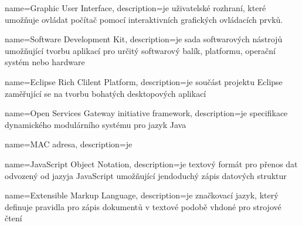 {
	name=Graphic User Interface,
	description={je uživatelské rozhraní, které umožňuje ovládat počítač pomocí
	interaktivních grafických ovládacích prvků.}
}

{
	name=Software Development Kit,
	description={je sada softwarových nástrojů umožňující tvorbu aplikací pro
	určitý softwarový balík, platformu, operační systém nebo hardware}
}

{
	name=Eclipse Rich Clilent Platform,
	description={je součást projektu Eclipse zaměřující se na tvorbu bohatých
	desktopových aplikací} 
}

{
	name=Open Services Gateway initiative framework,
	description={je specifikace dynamického modulárního systému pro jazyk Java} 
}

{
	name=MAC adresa,
	description={je } 
}

{
	name=JavaScript Object Notation,
	description={je textový formát pro přenos dat odvozený od jazyja JavaScript
	umožňující jendoduchý zápis datových struktur} 
}

{
	name=Extensible Markup Language,
	description={je značkovací jazyk, který definuje pravidla pro zápis dokumentů
	v textové podobě vhdoné pro strojové čtení} 
}


